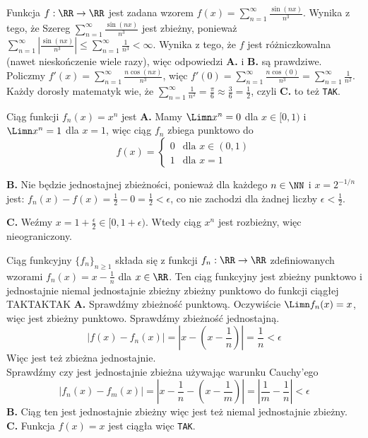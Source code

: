 \begin{solutions}
    \sol Funkcja $f:\RR\rightarrow\RR$ jest zadana wzorem $f(x)=\sum_{n=1}^\infty\frac{\sin(nx)}{n^3}$. Wynika z tego, że
    Szereg $\sum_{n=1}^\infty\frac{\sin(nx)}{n^3}$ jest zbieżny, ponieważ $\sum_{n=1}^\infty\left|\frac{\sin(nx)}{n^3}\right|\leq\sum_{n=1}^\infty\frac{1}{n^3}<\infty$. Wynika z tego, że $f$ jest różniczkowalna (nawet nieskończenie wiele razy), więc odpowiedzi \textbf{A.} i \textbf{B.} są prawdziwe. Policzmy $f'(x)=\sum_{n=1}^\infty\frac{n\cos(nx)}{n^3}$, więc $f'(0)=\sum_{n=1}^\infty\frac{n\cos(0)}{n^3}=\sum_{n=1}^\infty\frac{1}{n^2}$. Każdy dorosły matematyk wie, że $\sum_{n=1}^\infty\frac{1}{n^2}=\frac{\pi}{6}\approx\frac{3}{6}=\frac{1}{2}$, czyli \textbf{C.} to też \texttt{TAK}.
    
    \sol Ciąg funkcji $f_n(x) = x^n$ jest
    \answerss{zbieżny punktowo na $[0, 1]$}{zbieżny jednostajnie na $[0, 1)$}{ograniczony na $[0, 1 + \epsilon)$ dla pewnego $\epsilon > 0$}{TAK}{NIE}{NIE}
    \textbf{A.} Mamy $\Limn x^n=0$ dla $x\in[0,1)$ i $\Limn x^n=1$ dla $x=1$, więc ciąg $f_n$ zbiega punktowo do
    $$
    f(x) = \begin{cases}
        0 & \text{dla } x\in(0,1) \\
        1 & \text{dla } x = 1
    \end{cases}
    $$

    \textbf{B.} Nie będzie jednostajnej zbieżności, ponieważ dla każdego $n\in\NN$ i $x=2^{-1/n}$ jest: $f_n(x) - f(x) = \frac{1}{2} - 0 = \frac{1}{2}<\epsilon$, co nie zachodzi dla żadnej liczby $\epsilon<\frac{1}{2}$.

    \textbf{C.} Weźmy $x=1+\frac{\epsilon}{2}\in[0,1+\epsilon)$. Wtedy ciąg $x^n$ jest rozbieżny, więc nieograniczony.

    \sol Ciąg funkcyjny $\{f_n\}_{n\geq1}$ składa się z funkcji $f_n : \RR \rightarrow \RR$ zdefiniowanych wzorami $f_n(x) = x - \frac{1}{n}$ dla $x \in \RR$. Ten ciąg funkcyjny jest
    \answerss
    {zbieżny punktowo i jednostajnie}
    {niemal jednostajnie zbieżny}
    {zbieżny punktowo do funkcji ciągłej}
    {TAK}{TAK}{TAK}
    \textbf{A.} Sprawdźmy zbieżność punktową. Oczywiście $\Limn f_n(x) = x$, więc jest zbieżny punktowo. Sprawdźmy zbieżność jednostajną.
    $$
    |f(x) - f_n(x)| = \left|x - (x - \frac{1}{n})\right| = \frac{1}{n} < \epsilon
    $$
    Więc jest też zbieżna jednostajnie.\\
    Sprawdźmy czy jest jednostajnie zbieżna używając warunku Cauchy'ego
    $$
    |f_n(x) - f_m(x)| = \left|x - \frac{1}{n}- (x - \frac{1}{m})\right| = \left|\frac{1}{m} - \frac{1}{n}\right|< \epsilon
    $$
    \textbf{B.} Ciąg ten jest jednostajnie zbieżny więc jest też niemal jednostajnie zbieżny.\\
    \textbf{C.} Funkcja $f(x) = x$ jest ciągła więc \texttt{TAK}.
    

\end{solutions}
